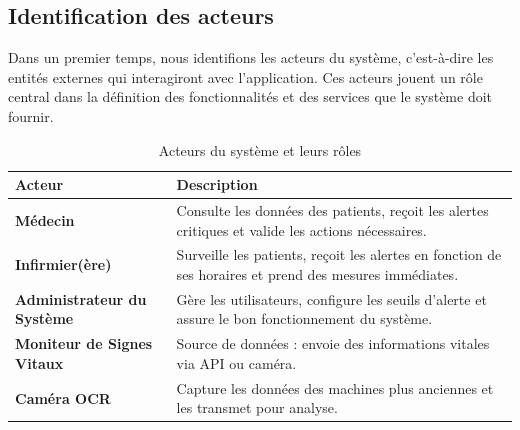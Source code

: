 \subsection{Identification des acteurs}

Dans un premier temps, nous identifions les acteurs du système, c'est-à-dire les entités externes qui interagiront avec l'application. Ces acteurs jouent un rôle central dans la définition des fonctionnalités et des services que le système doit fournir.
\begin{table}[H]
    \centering
    \renewcommand{\arraystretch}{1.3}
    \begin{tabular}{| m{3cm} | m{7cm} |}
        \hline
        \textbf{Acteur} & \textbf{Description} \\
        \hline
        \textbf{Médecin} & Consulte les données des patients, reçoit les alertes critiques et valide les actions nécessaires. \\
        \hline
        \textbf{Infirmier(ère)} & Surveille les patients, reçoit les alertes en fonction de ses horaires et prend des mesures immédiates. \\
        \hline
        \textbf{Administrateur du Système} & Gère les utilisateurs, configure les seuils d'alerte et assure le bon fonctionnement du système. \\
        \hline
        \textbf{Moniteur de Signes Vitaux} & Source de données : envoie des informations vitales via API ou caméra. \\
        \hline
        \textbf{Caméra OCR} & Capture les données des machines plus anciennes et les transmet pour analyse. \\
        \hline
    \end{tabular}
    \caption{Acteurs du système et leurs rôles}
\end{table}